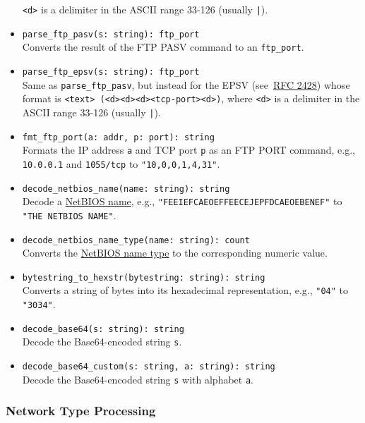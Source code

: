 \documentclass[10pt,landscape]{article}
\begin{document}
\begin{multicols*}{2}
\begin{itemize}
    \verb|<d>| is a delimiter in the ASCII range 33-126 (usually \verb#|#).
  \item \verb|parse_ftp_pasv(s: string): ftp_port|\\
    Converts the result of the FTP PASV command to an \verb|ftp_port|.
  \item \verb|parse_ftp_epsv(s: string): ftp_port|\\
    Same as \verb|parse_ftp_pasv|, but instead for the EPSV
    (see~\href{http://tools.ietf.org/html/rfc2428}{RFC 2428}) whose format is
    \verb|<text> (<d><d><d><tcp-port><d>)|, where \verb|<d>| is a delimiter in
    the ASCII range 33-126 (usually \verb#|#).
  \item \verb|fmt_ftp_port(a: addr, p: port): string|\\
    Formats the IP address \texttt{a} and TCP port \texttt{p} as an FTP
    PORT command, e.g., \verb|10.0.0.1| and \verb|1055/tcp| to
    \verb|"10,0,0,1,4,31"|.
  \item \verb|decode_netbios_name(name: string): string|\\
    Decode a \href{http://support.microsoft.com/kb/194203}{NetBIOS name}, e.g.,
    \verb|"FEEIEFCAEOEFFEECEJEPFDCAEOEBENEF"| to \verb|"THE NETBIOS NAME"|.
  \item \verb|decode_netbios_name_type(name: string): count|\\
    Converts the \href{http://support.microsoft.com/kb/163409}{NetBIOS name
    type} to the corresponding numeric value.
  \item \verb|bytestring_to_hexstr(bytestring: string): string|\\
    Converts a string of bytes into its hexadecimal representation, e.g.,
    \verb|"04"| to \verb|"3034"|.
  \item \verb|decode_base64(s: string): string|\\
    Decode the Base64-encoded string \verb|s|.
  \item \verb|decode_base64_custom(s: string, a: string): string|\\
    Decode the Base64-encoded string \verb|s| with alphabet \verb|a|.
\end{itemize}

\subsubsection*{Network Type Processing}


\end{multicols*}
\end{document}
